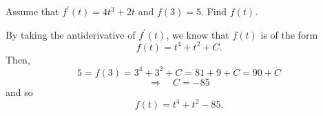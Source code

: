 \documentclass[handout,nooutcomes]{ximera}
\begin{document}
\begin{problem}
Assume that $f^\prime (t) = 4t^3 + 2t$ and $f(3) = 5$.  Find $f(t)$.
		\begin{freeResponse}
		By taking the antiderivative of $f^\prime (t)$, we know that $f(t)$ is of the form
		$$f(t) = t^4 + t^2 + C .$$
		Then,
		$$ 5 = f(3) = 3^4 + 3^2 + C = 81 + 9 + C = 90 + C$$
		$$\Longrightarrow \quad  C = -85 $$
		and so
		$$ f(t) = t^4 + t^2 - 85. $$
		\end{freeResponse}
		
		
		

\end{problem}






	
	
	
	
	
	
	
	
	

	










								
				
				
	
\end{document}
